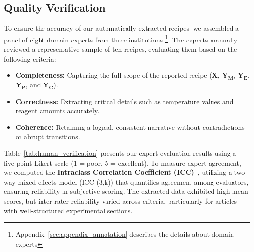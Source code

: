 \subsection{Quality Verification}
To ensure the accuracy of our automatically extracted recipes, we assembled a panel of eight domain experts from three institutions 
\footnote{Appendix~\ref{sec:appendix_annotation} describes the details about domain experts}. The experts manually reviewed a representative sample of ten recipes, evaluating them based on the following criteria:



\begin{itemize}
    \item \textbf{Completeness:} Capturing the full scope of the reported recipe (\textbf{X}, \(\mathbf{Y_M}\), \(\mathbf{Y_E}\), \(\mathbf{Y_P}\), and \(\mathbf{Y_C}\)).
    \item \textbf{Correctness:} Extracting critical details such as temperature values and reagent amounts accurately.
    \item \textbf{Coherence:} Retaining a logical, consistent narrative without contradictions or abrupt transitions.
\end{itemize}




Table~\ref{tab:human_verification} presents our expert evaluation results using a five-point Likert scale (1 = poor, 5 = excellent). To measure expert agreement, we computed the \textbf{Intraclass Correlation Coefficient (ICC)}~\cite{shrout1979intraclass}, utilizing a two-way mixed-effects model (ICC (3,k)) that quantifies agreement among evaluators, ensuring reliability in subjective scoring.
The extracted data exhibited high mean scores, but inter-rater reliability varied across criteria, particularly for articles with well-structured experimental sections.

